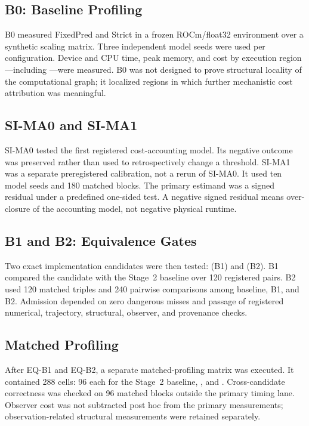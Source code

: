\subsection{B0: Baseline Profiling}

B0 measured FixedPred and Strict in a frozen ROCm/float32 environment over a synthetic
scaling matrix. Three independent model seeds were used per configuration. Device and
CPU time, peak memory, and cost by execution region---including
---were measured. B0 was not designed to prove structural
locality of the computational graph; it localized regions in which further
mechanistic cost attribution was meaningful.

\subsection{SI-MA0 and SI-MA1}

SI-MA0 tested the first registered  cost-accounting model. Its
negative outcome was preserved rather than used to retrospectively change a threshold.
SI-MA1 was a separate preregistered calibration, not a rerun of SI-MA0. It used ten
model seeds and 180 matched blocks. The primary estimand was a signed residual under a
predefined one-sided test. A negative signed residual means over-closure of the
accounting model, not negative physical runtime.

\subsection{B1 and B2: Equivalence Gates}

Two exact implementation candidates were then tested:
 (B1) and  (B2). B1 compared the
candidate with the Stage~2 baseline over 120 registered pairs. B2 used 120 matched
triples and 240 pairwise comparisons among baseline, B1, and B2. Admission depended on
zero dangerous misses and passage of registered numerical, trajectory, structural,
observer, and provenance checks.

\subsection{Matched Profiling}

After EQ-B1 and EQ-B2, a separate matched-profiling matrix was executed. It contained
288 cells: 96 each for the Stage~2 baseline, , and
. Cross-candidate correctness was checked on 96 matched blocks
outside the primary timing lane. Observer cost was not subtracted post hoc from the
primary measurements; observation-related structural measurements were retained
separately.

